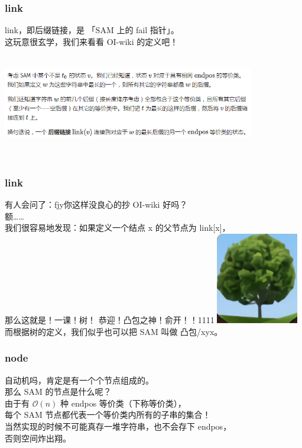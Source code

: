 \documentclass{beamer}
\begin{document}
    \begin{frame}
        \frametitle{link}
        link，即后缀链接，是 「SAM 上的 fail 指针」。\\
        这玩意很玄学，我们来看看 OI-wiki 的定义吧！\\
        \includegraphics[height=5cm,width=11cm]{g3.png}
    \end{frame}

    \begin{frame}
        \frametitle{link}
        有人会问了：fjy你这样没良心的抄 OI-wiki 好吗？\\
        额……\\
        我们很容易地发现：如果定义一个结点 x 的父节点为 link[x]，\\
        那么这就是！一课！树！
        \pause
        恭迎！凸包之神！俞开！！1111
        \pause
        \includegraphics[height=4cm]{g5.png} 
        而根据树的定义，我们似乎也可以把 SAM 叫做 凸包/xyx。
    \end{frame}

    \begin{frame}
        \frametitle{node}
        自动机吗，肯定是有一个个节点组成的。\\
        那么 SAM 的节点是什么呢？\\
        由于有 $\mathcal{O}(n)$ 种 endpos 等价类（下称等价类），\\
        每个 SAM 节点都代表一个等价类内所有的子串的集合！\\
        当然实现的时候不可能真存一堆字符串，也不会存下 endpos，\\
        否则空间炸出翔。
    \end{frame}
\end{document}
